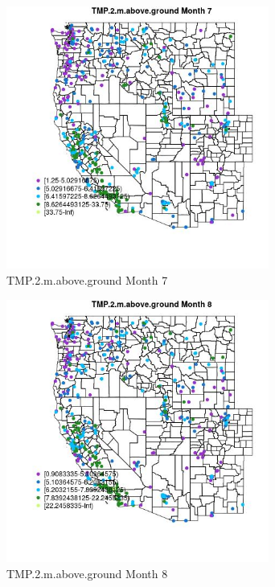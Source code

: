 \begin{figure} 
\centering  
\includegraphics[width=0.77\textwidth]{Code_Outputs/ML_input_report_ML_input_PM25_Step5_part_d_de_duplicated_aves_ML_input_MapObsMo7TMP2maboveground.jpg} 
\caption{\label{fig:ML_input_report_ML_input_PM25_Step5_part_d_de_duplicated_aves_ML_inputMapObsMo7TMP2maboveground}TMP.2.m.above.ground Month 7} 
\end{figure} 
 

\clearpage 

\begin{figure} 
\centering  
\includegraphics[width=0.77\textwidth]{Code_Outputs/ML_input_report_ML_input_PM25_Step5_part_d_de_duplicated_aves_ML_input_MapObsMo8TMP2maboveground.jpg} 
\caption{\label{fig:ML_input_report_ML_input_PM25_Step5_part_d_de_duplicated_aves_ML_inputMapObsMo8TMP2maboveground}TMP.2.m.above.ground Month 8} 
\end{figure} 
 

